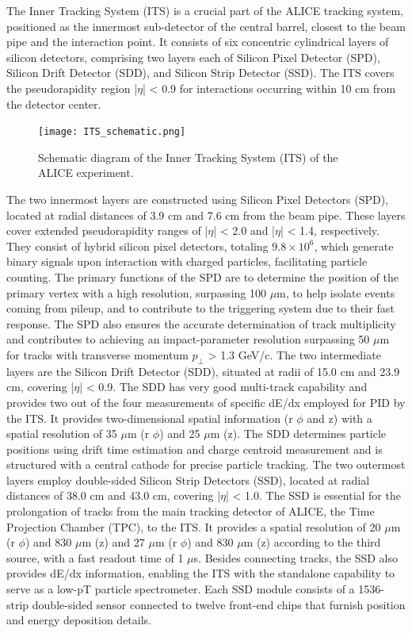 \documentclass[12pt,a4paper]{book}
\begin{document}
	The Inner Tracking System (ITS) is a crucial part of the ALICE tracking system, positioned as the innermost sub-detector of the central barrel, closest to the beam pipe and the interaction point. It consists of six concentric cylindrical layers of silicon detectors, comprising two layers each of Silicon Pixel Detector (SPD), Silicon Drift Detector (SDD), and Silicon Strip Detector (SSD). The ITS covers the pseudorapidity region |$\eta$| < 0.9 for interactions occurring within 10 cm from the detector center.
	\begin{figure}[h]
		\centering
		\texttt{[image: ITS\_schematic.png]}
		\caption{Schematic diagram of the Inner Tracking System (ITS) of the ALICE experiment.}
		\label{fig:ITS_schematic}
	\end{figure}
	The two innermost layers are constructed using Silicon Pixel Detectors (SPD), located at radial distances of 3.9 cm and 7.6 cm from the beam pipe. These layers cover extended pseudorapidity ranges of |$\eta$| < 2.0 and |$\eta$| < 1.4, respectively. They consist of hybrid silicon pixel detectors, totaling $9.8 × 10^6$, which generate binary signals upon interaction with charged particles, facilitating particle counting. The primary functions of the SPD are to determine the position of the primary vertex with a high resolution, surpassing 100 $\mu$m, to help isolate events coming from pileup, and to contribute to the triggering system due to their fast response. The SPD also ensures the accurate determination of track multiplicity and contributes to achieving an impact-parameter resolution surpassing 50 $\mu$m for tracks with transverse momentum $p_\perp$ > 1.3 GeV/c.
	The two intermediate layers are the Silicon Drift Detector (SDD), situated at radii of 15.0 cm and 23.9 cm, covering |$\eta$| < 0.9. The SDD has very good multi-track capability and provides two out of the four measurements of specific dE/dx employed for PID by the ITS. It provides two-dimensional spatial information (r $\phi$ and z) with a spatial resolution of 35 $\mu$m (r $\phi$) and 25 $\mu$m (z). The SDD determines particle positions using drift time estimation and charge centroid measurement and is structured with a central cathode for precise particle tracking.
	The two outermost layers employ double-sided Silicon Strip Detectors (SSD), located at radial distances of 38.0 cm and 43.0 cm, covering |$\eta$| < 1.0. The SSD is essential for the prolongation of tracks from the main tracking detector of ALICE, the Time Projection Chamber (TPC), to the ITS. It provides a spatial resolution of 20 $\mu$m (r $\phi$) and 830 $\mu$m (z) and 27 $\mu$m (r $\phi$) and 830 $\mu$m (z) according to the third source, with a fast readout time of 1 $\mu$s. Besides connecting tracks, the SSD also provides dE/dx information, enabling the ITS with the standalone capability to serve as a low-pT particle spectrometer. Each SSD module consists of a 1536-strip double-sided sensor connected to twelve front-end chips that furnish position and energy deposition details.
\end{document}
